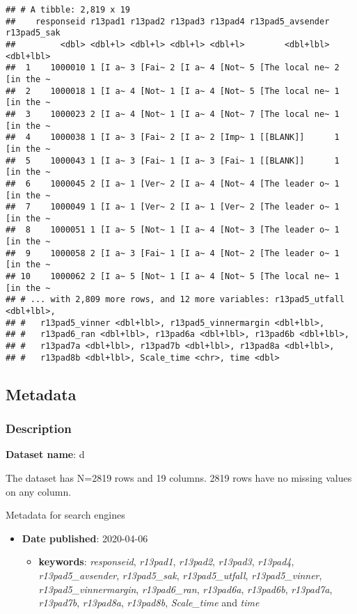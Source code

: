 \documentclass[
]{book}
\providecommand{\tightlist}{%
  \setlength{\itemsep}{0pt}\setlength{\parskip}{0pt}}
\begin{document}
\begin{verbatim}
## # A tibble: 2,819 x 19
##    responseid r13pad1 r13pad2 r13pad3 r13pad4 r13pad5_avsender r13pad5_sak
##         <dbl> <dbl+l> <dbl+l> <dbl+l> <dbl+l>        <dbl+lbl>   <dbl+lbl>
##  1    1000010 1 [I a~ 3 [Fai~ 2 [I a~ 4 [Not~ 5 [The local ne~ 2 [in the ~
##  2    1000018 1 [I a~ 4 [Not~ 1 [I a~ 4 [Not~ 5 [The local ne~ 1 [in the ~
##  3    1000023 2 [I a~ 4 [Not~ 1 [I a~ 4 [Not~ 7 [The local ne~ 1 [in the ~
##  4    1000038 1 [I a~ 3 [Fai~ 2 [I a~ 2 [Imp~ 1 [[BLANK]]      1 [in the ~
##  5    1000043 1 [I a~ 3 [Fai~ 1 [I a~ 3 [Fai~ 1 [[BLANK]]      1 [in the ~
##  6    1000045 2 [I a~ 1 [Ver~ 2 [I a~ 4 [Not~ 4 [The leader o~ 1 [in the ~
##  7    1000049 1 [I a~ 1 [Ver~ 2 [I a~ 1 [Ver~ 2 [The leader o~ 1 [in the ~
##  8    1000051 1 [I a~ 5 [Not~ 1 [I a~ 4 [Not~ 3 [The leader o~ 1 [in the ~
##  9    1000058 2 [I a~ 3 [Fai~ 1 [I a~ 4 [Not~ 2 [The leader o~ 1 [in the ~
## 10    1000062 2 [I a~ 5 [Not~ 1 [I a~ 4 [Not~ 5 [The local ne~ 1 [in the ~
## # ... with 2,809 more rows, and 12 more variables: r13pad5_utfall <dbl+lbl>,
## #   r13pad5_vinner <dbl+lbl>, r13pad5_vinnermargin <dbl+lbl>,
## #   r13pad6_ran <dbl+lbl>, r13pad6a <dbl+lbl>, r13pad6b <dbl+lbl>,
## #   r13pad7a <dbl+lbl>, r13pad7b <dbl+lbl>, r13pad8a <dbl+lbl>,
## #   r13pad8b <dbl+lbl>, Scale_time <chr>, time <dbl>
\end{verbatim}

\hypertarget{metadata-2}{%
\subsection{Metadata}\label{metadata-2}}

\hypertarget{description-2}{%
\subsubsection{Description}\label{description-2}}

\textbf{Dataset name}: d

The dataset has N=2819 rows and 19 columns.
2819 rows have no missing values on any column.

Metadata for search engines

\begin{itemize}
\item
  \textbf{Date published}: 2020-04-06

  \begin{itemize}
  \tightlist
  \item
    \textbf{keywords}: \emph{responseid}, \emph{r13pad1}, \emph{r13pad2}, \emph{r13pad3}, \emph{r13pad4}, \emph{r13pad5\_avsender}, \emph{r13pad5\_sak}, \emph{r13pad5\_utfall}, \emph{r13pad5\_vinner}, \emph{r13pad5\_vinnermargin}, \emph{r13pad6\_ran}, \emph{r13pad6a}, \emph{r13pad6b}, \emph{r13pad7a}, \emph{r13pad7b}, \emph{r13pad8a}, \emph{r13pad8b}, \emph{Scale\_time} and \emph{time}
  \end{itemize}
\end{itemize}
\end{document}

